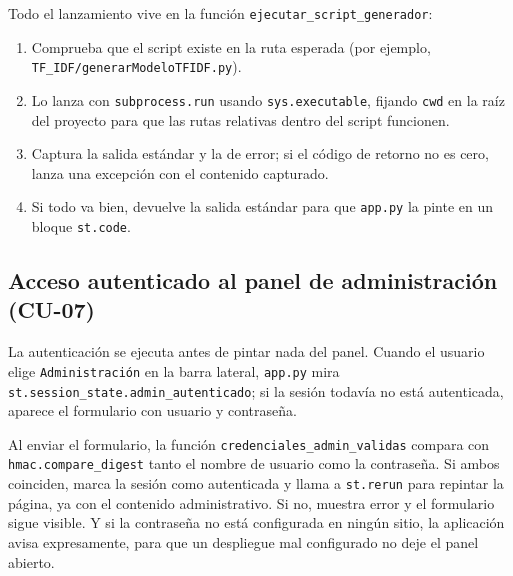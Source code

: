 
Todo el lanzamiento vive en la función \texttt{ejecutar\_script\_generador}:

\begin{enumerate}
	\item Comprueba que el script existe en la ruta esperada (por ejemplo, \texttt{TF\_IDF/gen\-erar\-Mo\-de\-lo\-TFIDF.py}).
	\item Lo lanza con \texttt{sub\-process.run} usando \texttt{sys.executable}, fijando \texttt{cwd} en la raíz del proyecto para que las rutas relativas dentro del script funcionen.
	\item Captura la salida estándar y la de error; si el código de retorno no es cero, lanza una excepción con el contenido capturado.
	\item Si todo va bien, devuelve la salida estándar para que \texttt{app.py} la pinte en un bloque \texttt{st.code}.
\end{enumerate}


\subsection*{Acceso autenticado al panel de administración (CU-07)}

La autenticación se ejecuta antes de pintar nada del panel. Cuando el usuario elige \texttt{Administración} en la barra lateral, \texttt{app.py} mira \texttt{st.ses\-sion\_state.admin\_autenticado}; si la sesión todavía no está autenticada, aparece el formulario con usuario y contraseña.


Al enviar el formulario, la función \texttt{credenciales\_admin\_validas} compara con \texttt{hmac.compare\_digest} tanto el nombre de usuario como la contraseña. Si ambos coinciden, marca la sesión como autenticada y llama a \texttt{st.rerun} para repintar la página, ya con el contenido administrativo. Si no, muestra error y el formulario sigue visible. Y si la contraseña no está configurada en ningún sitio, la aplicación avisa expresamente, para que un despliegue mal configurado no deje el panel abierto.